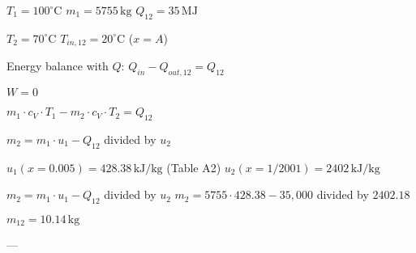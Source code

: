 \( T_1 = 100^\circ \text{C} \)  
\( m_1 = 5755 \, \text{kg} \)  
\( Q_{12} = 35 \, \text{MJ} \)  

\( T_2 = 70^\circ \text{C} \)  
\( T_{in,12} = 20^\circ \text{C} \) (\( x = A \))  

Energy balance with \( Q \):  
\( Q_{in} - Q_{out,12} = Q_{12} \)  

\( W = 0 \)  

\( m_1 \cdot c_V \cdot T_1 - m_2 \cdot c_V \cdot T_2 = Q_{12} \)  

\( m_2 = m_1 \cdot u_1 - Q_{12} \) divided by \( u_2 \)  

\( u_1 (x = 0.005) = 428.38 \, \text{kJ/kg} \) (Table A2)  
\( u_2 (x = 1 / 2001) = 2402 \, \text{kJ/kg} \)  

\( m_2 = m_1 \cdot u_1 - Q_{12} \) divided by \( u_2 \)  
\( m_2 = 5755 \cdot 428.38 - 35,000 \) divided by \( 2402.18 \)  

\( m_{12} = 10.14 \, \text{kg} \)  

---